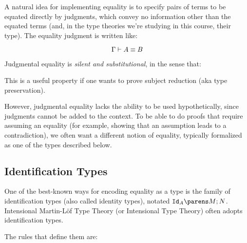 \documentclass[11pt]{article}
\begin{document}
A natural idea for implementing equality is to specify pairs of terms to be equated directly by judgments, which convey no information other than the equated terms (and, in the type theories we're studying in this course, their type). The equality judgment is written like:

\[
	\eqtype{\Gamma}{A}{B}
\]

Judgmental equality is \emph{silent and substitutional}, in the sense that:

\begin{prooftree*}
\end{prooftree*}

This is a useful property if one wants to prove subject reduction (aka type preservation).

However, judgmental equality lacks the ability to be used hypothetically, since judgments cannot be added to the context. To be able to do proofs that require assuming an equality (for example, showing that an assumption leads to a contradiction), we often want a different notion of equality, typically formalized as one of the types described below.

\subsection{Identification Types}

One of the best-known ways for encoding equality as a type is the family of identification types (also called identity types), notated $\idtype{A}{M}{N}$. Intensional Martin-L\"of Type Theory (or Intensional Type Theory) often adopts identification types.

The rules that define them are:
\end{document}
